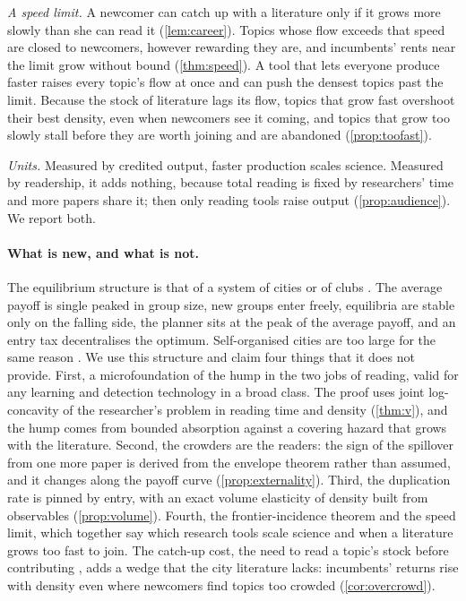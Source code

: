 \emph{A speed limit.} A newcomer can catch up with a literature only if it
grows more slowly than she can read it (\cref{lem:career}). Topics whose flow
exceeds that speed are closed to newcomers, however rewarding they are, and
incumbents' rents near the limit grow without bound (\cref{thm:speed}). A tool
that lets everyone produce faster raises every topic's flow at once and can
push the densest topics past the limit. Because the stock of literature lags
its flow, topics that grow fast overshoot their best density, even when
newcomers see it coming, and topics that grow too slowly stall before they are
worth joining and are abandoned (\cref{prop:toofast}).

\emph{Units.} Measured by credited output, faster production scales science.
Measured by readership, it adds nothing, because total reading is fixed by
researchers' time and more papers share it; then only reading tools raise
output (\cref{prop:audience}). We report both.

\paragraph{What is new, and what is not.} The equilibrium structure is that of
a system of cities \citep{henderson1974} or of clubs \citep{buchanan1965}. The
average payoff is single peaked in group size, new groups enter freely,
equilibria are stable only on the falling side, the planner sits at the peak
of the average payoff, and an entry tax decentralises the optimum. Self-organised
cities are too large for the same reason \citep{hendersonbecker2000,scotchmer2002}.
We use this structure and claim four things that it does not provide. First,
a microfoundation of the hump in the two jobs of reading, valid for any
learning and detection technology in a broad class. The proof uses joint
log-concavity of the researcher's problem in reading time and density
(\cref{thm:v}), and the hump comes from bounded absorption against a covering
hazard that grows with the literature. Second, the crowders are the readers:
the sign of the spillover from one more paper is derived from the envelope
theorem rather than assumed, and it changes along the payoff curve
(\cref{prop:externality}). Third, the duplication rate is pinned by entry, with
an exact volume elasticity of density built from observables
(\cref{prop:volume}). Fourth, the frontier-incidence theorem and the speed
limit, which together say which research tools scale science and when a
literature grows too fast to join. The catch-up cost, the need to read a
topic's stock before contributing \citep{jones2009}, adds a wedge that the city
literature lacks: incumbents' returns rise with density even where newcomers
find topics too crowded (\cref{cor:overcrowd}).

